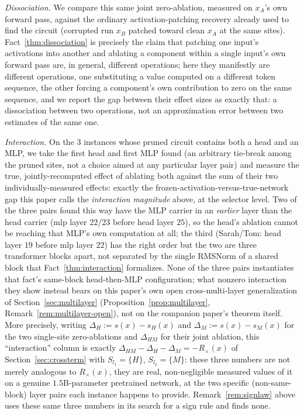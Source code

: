 \documentclass[11pt,a4paper]{article}
\begin{document}
\emph{Dissociation.} We compare this same joint zero-ablation, measured on
$x_A$'s own forward pass, against the ordinary activation-patching recovery
already used to find the circuit (corrupted run $x_B$ patched toward clean
$x_A$ at the same sites). Fact~\ref{thm:dissociation} is precisely the
claim that patching one input's activations into another and ablating a
component within a single input's own forward pass are, in general,
different operations; here they manifestly are different operations, one
substituting a value computed on a different token sequence, the other
forcing a component's own contribution to zero on the same sequence, and we
report the gap between their effect sizes as exactly that: a dissociation
between two operations, not an approximation error between two estimates of
the same one.

\emph{Interaction.} On the $3$ instances whose pruned circuit contains both
a head and an MLP, we take the first head and first MLP found (an arbitrary
tie-break among the pruned sites, not a choice aimed at any particular
layer pair) and measure the true, jointly-recomputed effect of ablating both
against the sum of their two individually-measured effects: exactly the
frozen-activation-versus-true-network gap this paper calls the
\emph{interaction magnitude} above, at the selector level. Two of the three
pairs found this way have the MLP carrier in an \emph{earlier} layer than
the head carrier (mlp layer $22$/$23$ before head layer $25$), so the
head's ablation cannot be reaching that MLP's own computation at all; the
third (Sarah/Tom: head layer $19$ before mlp layer $22$) has the right order
but the two are three transformer blocks apart, not separated by the single
RMSNorm of a shared block that Fact~\ref{thm:interaction} formalizes. None
of the three pairs instantiates that fact's same-block head-then-MLP
configuration; what nonzero interaction they show instead bears on this
paper's own open cross-multi-layer generalization of
Section~\ref{sec:multilayer} (Proposition~\ref{prop:multilayer},
Remark~\ref{rem:multilayer-open}), not on the companion paper's theorem
itself. More precisely, writing $\Delta_H:=s(x)-s_H(x)$ and
$\Delta_M:=s(x)-s_M(x)$ for the two single-site zero-ablations and
$\Delta_{HM}$ for their joint ablation, this ``interaction'' column is
exactly $\Delta_{HM}-\Delta_H-\Delta_M=-R_\times(x)$ of
Section~\ref{sec:crossterm} with $S_{l_1}=\{H\}$, $S_{l_2}=\{M\}$: these three
numbers are not merely analogous to $R_\times(x)$, they are real,
non-negligible measured values of it on a genuine $1.5$B-parameter pretrained
network, at the two specific (non-same-block) layer pairs each instance
happens to provide. Remark~\ref{rem:signlaw} above uses these same three
numbers in its search for a sign rule and finds none.
\end{document}
